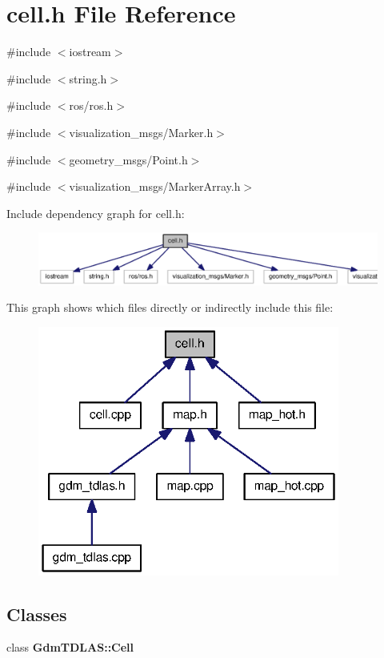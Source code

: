 \section{cell.h File Reference}
\label{cell_8h}
{\ttfamily \#include $<$iostream$>$}\par
{\ttfamily \#include $<$string.h$>$}\par
{\ttfamily \#include $<$ros/ros.h$>$}\par
{\ttfamily \#include $<$visualization\_\-msgs/Marker.h$>$}\par
{\ttfamily \#include $<$geometry\_\-msgs/Point.h$>$}\par
{\ttfamily \#include $<$visualization\_\-msgs/MarkerArray.h$>$}\par
Include dependency graph for cell.h:
\nopagebreak
\begin{figure}[H]
\begin{center}
\leavevmode
\includegraphics[width=400pt]{cell_8h__incl}
\end{center}
\end{figure}
This graph shows which files directly or indirectly include this file:
\nopagebreak
\begin{figure}[H]
\begin{center}
\leavevmode
\includegraphics[width=281pt]{cell_8h__dep__incl}
\end{center}
\end{figure}
\subsection*{Classes}
\begin{DoxyCompactItemize}
\item 
class {\bf GdmTDLAS::Cell}
\end{DoxyCompactItemize}
